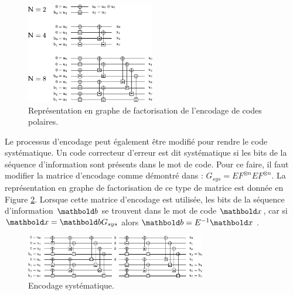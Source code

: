 \begin{figure}[t]
\centering
\includegraphics[width=0.5\textwidth]{main/ch1_fig/Graph_N_rec}
\caption{Représentation en graphe de factorisation de l'encodage de codes polaires.}
\label{fig:encodage}
\end{figure}

Le processus d'encodage peut également être modifié pour rendre le code systématique. Un code correcteur d'erreur est dit systématique si les bits de la séquence d'information sont présents dans le mot de code. Pour ce faire, il faut modifier la matrice d'encodage comme démontré dans \cite{arikan_systematic_2011} : $G_{sys}=EF^{\otimes n}EF^{\otimes n}$. La représentation en graphe de factorisation de ce type de matrice est donnée en Figure \ref{fig:sys}. Lorsque cette matrice d'encodage est utilisée, les bits de la séquence d'information $\mb{b}$ se trouvent dans le mot de code $\mb{x}$, car si $\mb{x}=\mb{b}G_{sys}$ alors $\mb{b}=E^{-1}\mb{x}$ .

\begin{figure}[t]
\centering
\includegraphics[width=0.7\textwidth]{main/ch1_fig/Graph_N_sys}
\caption{Encodage systématique.}
\label{fig:sys}
\end{figure}

